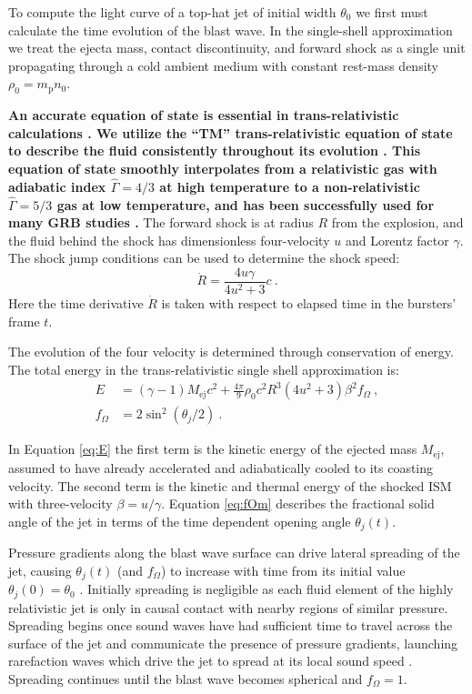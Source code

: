 \documentclass[twocolumn]{aastex62}
\newcommand{\Mej}{\ensuremath{M_{\mathrm{ej}}}}
\newcommand{\Mp}{\ensuremath{m_{\mathrm{p}}}}
\begin{document}
To compute the light curve of a top-hat jet of initial width $\theta_0$ we first must calculate the time evolution of the blast wave. In the single-shell approximation we treat the ejecta mass, contact discontinuity, and forward shock as a single unit propagating through a cold ambient medium with constant rest-mass density $\rho_0 = \Mp n_0$.  

{\bf An accurate equation of state is essential in trans-relativistic calculations \citep{Mignone:2007aa}.  We utilize the ``TM'' trans-relativistic equation of state to describe the fluid consistently throughout its evolution \citep{Mathews:1971aa, Mignone:2005aa}.  This equation of state smoothly interpolates from a relativistic gas with adiabatic index $\hat \Gamma = 4/3$ at high temperature to a non-relativistic $\hat \Gamma = 5/3$ gas at low temperature, and has been successfully used for many GRB studies \citep[e.g.][]{Uhm:2011aa, van-Eerten:2012aa}. } The forward shock is at radius $R$ from the explosion, and the fluid behind the shock has dimensionless four-velocity $u$ and Lorentz factor $\gamma$.  The shock jump conditions can be used to determine the shock speed:
\begin{equation}
	\dot{R} = \frac{4 u \gamma}{4 u^2 +3}c\ . \label{eq:Rdot}
\end{equation}
Here the time derivative $\dot{R}$ is taken with respect to elapsed time in the bursters' frame $t$.  

 The evolution of the four velocity is determined through conservation of energy.  The total energy in the trans-relativistic single shell approximation is:
\begin{align}
	E &= (\gamma - 1)\Mej c^2 + \frac{4\pi}{9} \rho_0 c^2 R^3 (4 u^2 + 3) \beta^2 f_\Omega \ , \label{eq:E} \\
	f_\Omega &= 2 \sin^2\left( \theta_j / 2 \right)\ . \label{eq:fOm}
\end{align}

In Equation \eqref{eq:E} the first term is the kinetic energy of the ejected mass $\Mej$, assumed to have already accelerated and adiabatically cooled to its coasting velocity. The second term is the kinetic and thermal energy of the shocked ISM with three-velocity $\beta = u / \gamma$.  Equation \eqref{eq:fOm} describes the fractional solid angle of the jet in terms of the time dependent opening angle $\theta_j(t)$. 

Pressure gradients along the blast wave surface can drive lateral spreading of the jet, causing $\theta_j(t)$ (and $f_\Omega$) to increase with time  from its initial value $\theta_j(0) = \theta_0$ \citep{Rhoads:1999aa}.  Initially spreading is negligible as each fluid element of the highly relativistic jet is only in causal contact with nearby regions of similar pressure.  Spreading begins once sound waves have had sufficient time to travel across the surface of the jet and communicate the presence of pressure gradients, launching rarefaction waves which drive the jet to spread at its local sound speed \citep{Rhoads:1999aa, van-Eerten:2012aa, Duffell:2018aa}.  Spreading continues until the blast wave becomes spherical and $f_\Omega = 1$.
\end{document}
